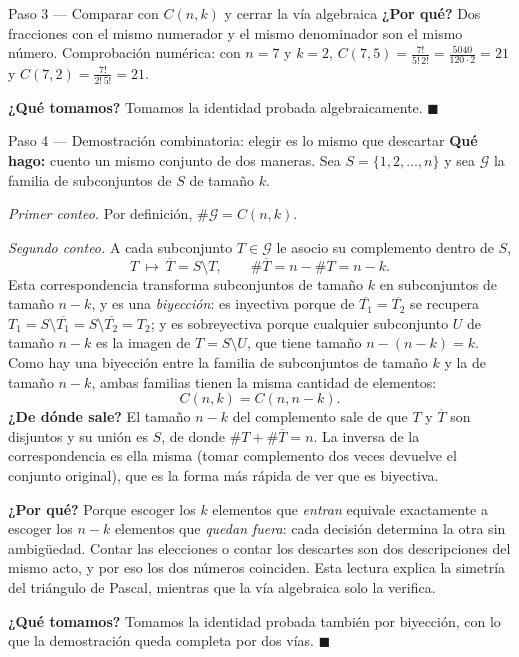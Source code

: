 \documentclass[11pt]{article}
\begin{document}
\begin{sol}
\begin{paso}{Paso 3 --- Comparar con $C(n,k)$ y cerrar la vía algebraica}
\textbf{¿Por qué?} Dos fracciones con el mismo numerador y el mismo denominador son el mismo
número. Comprobación numérica: con $n=7$ y $k=2$,
$C(7,5)=\frac{7!}{5!\,2!}=\frac{5040}{120\cdot 2}=21$ y
$C(7,2)=\frac{7!}{2!\,5!}=21$.

\textbf{¿Qué tomamos?} Tomamos la identidad probada algebraicamente. $\blacksquare$
\end{paso}

\begin{paso}{Paso 4 --- Demostración combinatoria: elegir es lo mismo que descartar}
\textbf{Qué hago:} cuento un mismo conjunto de dos maneras. Sea
$S=\{1,2,\dots,n\}$ y sea $\mathcal{G}$ la familia de subconjuntos de $S$ de tamaño $k$.

\emph{Primer conteo.} Por definición, $\#\mathcal{G}=C(n,k)$.

\emph{Segundo conteo.} A cada subconjunto $T\in\mathcal{G}$ le asocio su complemento dentro de
$S$,
\[
T\ \longmapsto\ \overline{T}=S\setminus T,\qquad
\#\overline{T}=n-\#T=n-k .
\]
Esta correspondencia transforma subconjuntos de tamaño $k$ en subconjuntos de tamaño $n-k$, y
es una \emph{biyección}: es inyectiva porque de $\overline{T_1}=\overline{T_2}$ se recupera
$T_1=S\setminus\overline{T_1}=S\setminus\overline{T_2}=T_2$; y es sobreyectiva porque
cualquier subconjunto $U$ de tamaño $n-k$ es la imagen de $T=S\setminus U$, que tiene tamaño
$n-(n-k)=k$. Como hay una biyección entre la familia de subconjuntos de tamaño $k$ y la de
tamaño $n-k$, ambas familias tienen la misma cantidad de elementos:
\[
C(n,k)=C(n,n-k).
\]
\textbf{¿De dónde sale?} El tamaño $n-k$ del complemento sale de que $T$ y $\overline{T}$ son
disjuntos y su unión es $S$, de donde $\#T+\#\overline{T}=n$. La inversa de la
correspondencia es ella misma (tomar complemento dos veces devuelve el conjunto original),
que es la forma más rápida de ver que es biyectiva.

\textbf{¿Por qué?} Porque escoger los $k$ elementos que \emph{entran} equivale exactamente a
escoger los $n-k$ elementos que \emph{quedan fuera}: cada decisión determina la otra sin
ambigüedad. Contar las elecciones o contar los descartes son dos descripciones del mismo acto,
y por eso los dos números coinciden. Esta lectura explica la simetría del triángulo de
Pascal, mientras que la vía algebraica solo la verifica.

\textbf{¿Qué tomamos?} Tomamos la identidad probada también por biyección, con lo que la
demostración queda completa por dos vías. $\blacksquare$
\end{paso}
\end{sol}
\end{document}
